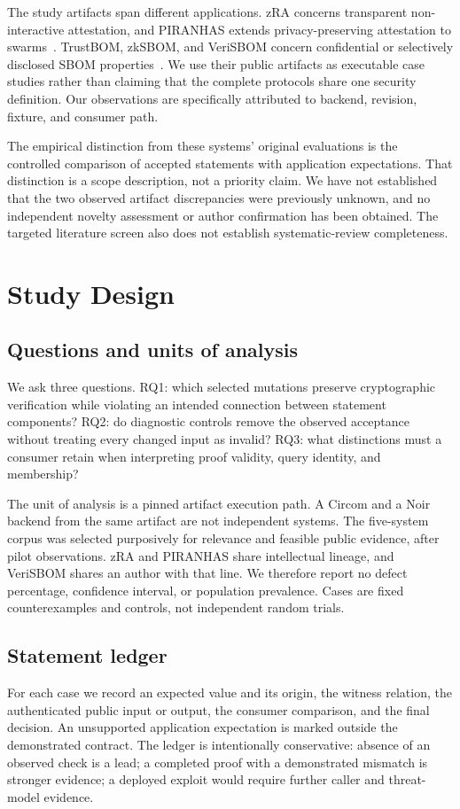 \documentclass[sigconf,nonacm]{acmart}
\begin{document}
The study artifacts span different applications. zRA concerns transparent non-interactive attestation, and PIRANHAS extends privacy-preserving attestation to swarms~\cite{zra,piranhas}. TrustBOM, zkSBOM, and VeriSBOM concern confidential or selectively disclosed SBOM properties~\cite{trustbom,zksbom,verisbom}. We use their public artifacts as executable case studies rather than claiming that the complete protocols share one security definition. Our observations are specifically attributed to backend, revision, fixture, and consumer path.

The empirical distinction from these systems' original evaluations is the controlled comparison of accepted statements with application expectations. That distinction is a scope description, not a priority claim. We have not established that the two observed artifact discrepancies were previously unknown, and no independent novelty assessment or author confirmation has been obtained. The targeted literature screen also does not establish systematic-review completeness.

\section{Study Design}
\subsection{Questions and units of analysis}
We ask three questions. RQ1: which selected mutations preserve cryptographic verification while violating an intended connection between statement components? RQ2: do diagnostic controls remove the observed acceptance without treating every changed input as invalid? RQ3: what distinctions must a consumer retain when interpreting proof validity, query identity, and membership?

The unit of analysis is a pinned artifact execution path. A Circom and a Noir backend from the same artifact are not independent systems. The five-system corpus was selected purposively for relevance and feasible public evidence, after pilot observations. zRA and PIRANHAS share intellectual lineage, and VeriSBOM shares an author with that line. We therefore report no defect percentage, confidence interval, or population prevalence. Cases are fixed counterexamples and controls, not independent random trials.

\subsection{Statement ledger}
For each case we record an expected value and its origin, the witness relation, the authenticated public input or output, the consumer comparison, and the final decision. An unsupported application expectation is marked outside the demonstrated contract. The ledger is intentionally conservative: absence of an observed check is a lead; a completed proof with a demonstrated mismatch is stronger evidence; a deployed exploit would require further caller and threat-model evidence.
\end{document}
